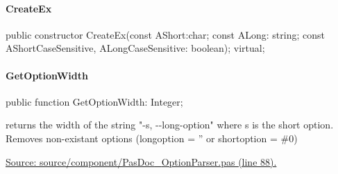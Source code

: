 \documentclass{report}
\newif\ifpdf
\begin{document}
\paragraph*{CreateEx}\hspace*{\fill}

\label{PasDoc_OptionParser.TOption-CreateEx}
\begin{list}{}{
\setlength{\itemindent}{0cm}
\setlength{\listparindent}{0cm}
\setlength{\leftmargin}{\evensidemargin}
\addtolength{\leftmargin}{\tmplength}
\settowidth{\labelsep}{X}
\addtolength{\leftmargin}{\labelsep}
\setlength{\labelwidth}{\tmplength}
}
\item[\textbf{Declaration}\hfill]
\ifpdf
\begin{flushleft}
\fi
\begin{ttfamily}
public constructor CreateEx(const AShort:char; const ALong: string; const AShortCaseSensitive, ALongCaseSensitive: boolean); virtual;\end{ttfamily}

\ifpdf
\end{flushleft}
\fi

\end{list}
\paragraph*{GetOptionWidth}\hspace*{\fill}

\label{PasDoc_OptionParser.TOption-GetOptionWidth}
\begin{list}{}{
\setlength{\itemindent}{0cm}
\setlength{\listparindent}{0cm}
\setlength{\leftmargin}{\evensidemargin}
\addtolength{\leftmargin}{\tmplength}
\settowidth{\labelsep}{X}
\addtolength{\leftmargin}{\labelsep}
\setlength{\labelwidth}{\tmplength}
}
\item[\textbf{Declaration}\hfill]
\ifpdf
\begin{flushleft}
\fi
\begin{ttfamily}
public function GetOptionWidth: Integer;\end{ttfamily}

\ifpdf
\end{flushleft}
\fi

\par
\item[\textbf{Description}]
returns the width of the string "{-}s, {-}{-}long{-}option" where s is the short option. Removes non{-}existant options (longoption = '' or shortoption = {\#}0)\par
\href{https://github.com/pasdoc/pasdoc/blob/master/source/component/PasDoc_OptionParser.pas#L88}{Source: source/component/PasDoc{\_}OptionParser.pas (line 88).}

\end{list}
\end{document}
